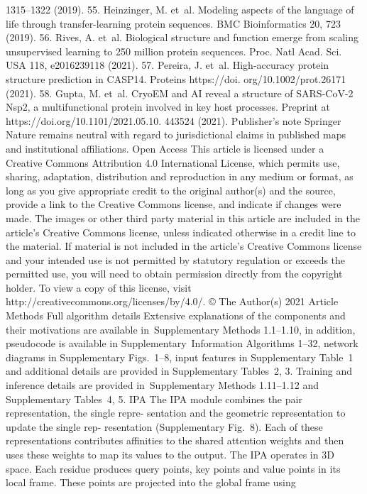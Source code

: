 1315–1322 (2019).
55.	 Heinzinger, M. et al. Modeling aspects of the language of life through transfer-learning
protein sequences. BMC Bioinformatics 20, 723 (2019).
56.	 Rives, A. et al. Biological structure and function emerge from scaling unsupervised
learning to 250 million protein sequences. Proc. Natl Acad. Sci. USA 118, e2016239118
(2021).
57.
Pereira, J. et al. High-accuracy protein structure prediction in CASP14. Proteins https://doi.
org/10.1002/prot.26171 (2021).
58.	 Gupta, M. et al. CryoEM and AI reveal a structure of SARS-CoV-2 Nsp2, a multifunctional
protein involved in key host processes. Preprint at https://doi.org/10.1101/2021.05.10.
443524 (2021).
Publisher’s note Springer Nature remains neutral with regard to jurisdictional claims in
published maps and institutional affiliations.
Open Access This article is licensed under a Creative Commons Attribution
4.0 International License, which permits use, sharing, adaptation, distribution
and reproduction in any medium or format, as long as you give appropriate
credit to the original author(s) and the source, provide a link to the Creative Commons license,
and indicate if changes were made. The images or other third party material in this article are
included in the article’s Creative Commons license, unless indicated otherwise in a credit line
to the material. If material is not included in the article’s Creative Commons license and your
intended use is not permitted by statutory regulation or exceeds the permitted use, you will
need to obtain permission directly from the copyright holder. To view a copy of this license,
visit http://creativecommons.org/licenses/by/4.0/.
© The Author(s) 2021
Article
Methods
Full algorithm details
Extensive explanations of the components and their motivations are
available in Supplementary Methods 1.1–1.10, in addition, pseudocode
is available in Supplementary Information Algorithms 1–32, network
diagrams in Supplementary Figs. 1–8, input features in Supplementary
Table 1 and additional details are provided in Supplementary Tables 2, 3.
Training and inference details are provided in Supplementary Methods
1.11–1.12 and Supplementary Tables 4, 5.
IPA
The IPA module combines the pair representation, the single repre-
sentation and the geometric representation to update the single rep-
resentation (Supplementary Fig. 8). Each of these representations
contributes affinities to the shared attention weights and then uses
these weights to map its values to the output. The IPA operates in 3D
space. Each residue produces query points, key points and value points
in its local frame. These points are projected into the global frame using
